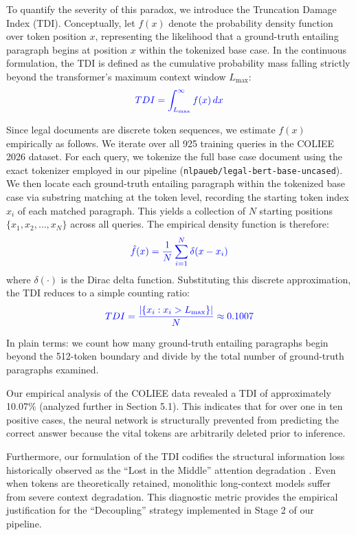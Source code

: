 \documentclass[sigconf]{acmart}
\newcommand{\rev}[1]{{\color{blue}#1}}
\begin{document}
\rev{To quantify the severity of this paradox, we introduce the Truncation Damage Index (TDI). Conceptually, let $f(x)$ denote the probability density function over token position $x$, representing the likelihood that a ground-truth entailing paragraph begins at position $x$ within the tokenized base case. In the continuous formulation, the TDI is defined as the cumulative probability mass falling strictly beyond the transformer's maximum context window $L_{\max}$:}
\begin{equation}
    \rev{TDI = \int_{L_{\max}}^{\infty} f(x)\,dx}
\end{equation}

\rev{Since legal documents are discrete token sequences, we estimate $f(x)$ empirically as follows. We iterate over all 925 training queries in the COLIEE 2026 dataset. For each query, we tokenize the full base case document using the exact tokenizer employed in our pipeline (\texttt{nlpaueb/legal-bert-base-uncased}). We then locate each ground-truth entailing paragraph within the tokenized base case via substring matching at the token level, recording the starting token index $x_i$ of each matched paragraph. This yields a collection of $N$ starting positions $\{x_1, x_2, \ldots, x_N\}$ across all queries. The empirical density function is therefore:}
\begin{equation}
    \rev{\hat{f}(x) = \frac{1}{N} \sum_{i=1}^{N} \delta(x - x_i)}
\end{equation}
\rev{where $\delta(\cdot)$ is the Dirac delta function. Substituting this discrete approximation, the TDI reduces to a simple counting ratio:}
\begin{equation}
    \rev{TDI = \frac{|\{x_i : x_i > L_{\max}\}|}{N} \approx 0.1007}
\end{equation}

\rev{In plain terms: we count how many ground-truth entailing paragraphs begin beyond the 512-token boundary and divide by the total number of ground-truth paragraphs examined.}

Our empirical analysis of the COLIEE data revealed a TDI of \rev{approximately} 10.07\% (analyzed further in Section \rev{5.1}). This indicates that for over one in ten positive cases, the neural network is \rev{structurally prevented} from predicting the correct answer because the vital tokens are arbitrarily deleted prior to inference. 

Furthermore, our formulation of the TDI codifies the structural information loss historically observed as the ``Lost in the Middle'' attention degradation \cite{liu2024lost}. Even when tokens are theoretically retained, monolithic long-context models suffer from severe context degradation. This diagnostic metric provides the empirical justification for the ``Decoupling'' strategy implemented in Stage 2 of our pipeline.
\end{document}
